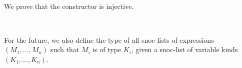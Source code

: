 \begin{code}
\>[2]   \<%
\\
\>[2]\<[4]%
\>[4] \AgdaSymbol{:}  \AgdaSymbol{\{}\AgdaSymbol{\}}        \<%
\\
\>[2]\<[4]%
\>[4] \AgdaSymbol{:}  \AgdaSymbol{\{}\AgdaSymbol{\}} \AgdaSymbol{\{}\AgdaSymbol{\}}   \AgdaSymbol{(}  \AgdaSymbol{)}        \<%
\\
\>[2]\<[4]%
\>[4]\AgdaInductiveConstructor{[]} \AgdaSymbol{:}   \AgdaInductiveConstructor{[]}\<%
\\
\>[2]\<[4]%
\>[4] \AgdaSymbol{:}  \AgdaSymbol{\{}\AgdaSymbol{\}} \AgdaSymbol{\{}\AgdaSymbol{\}}            \AgdaSymbol{(}  \AgdaSymbol{)}\<%
\end{code}

We prove that the constructor  is injective.

\begin{code}%
\>[0]\<[2]%
\>[2] \AgdaSymbol{:}  \AgdaSymbol{\{}\AgdaSymbol{\}} \AgdaSymbol{\{}\AgdaSymbol{\}} \AgdaSymbol{\{}  \AgdaSymbol{:}   \AgdaSymbol{\}}          \<%
\\
\>[0]\<[2]%
\>[2]  \AgdaSymbol{=} \<%
\end{code}

For the future, we also define the type of all snoc-lists of expressions $(M_1, \ldots, M_n)$
such that $M_i$ is of type $K_i$, given a snoc-list of variable kinds $(K_1, \ldots, K_n)$.

